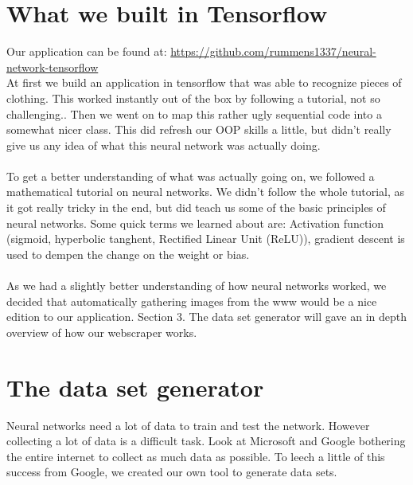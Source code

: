 \documentclass[fleqn,10pt]{SelfArx} %
\begin{document}
\section{What we built in Tensorflow}
Our application can be found at: \url{https://github.com/rummens1337/neural-network-tensorflow}\\
At first we build an application in tensorflow that was able to recognize pieces of clothing. This worked instantly out of the box by following a tutorial, not so challenging.. Then we went on to map this rather ugly sequential code into a somewhat nicer class. This did refresh our OOP skills a little, but didn't really give us any idea of what this neural network was actually doing. \\ \\
To get a better understanding of what was actually going on, we followed a mathematical tutorial on neural networks. We didn't follow the whole tutorial, as it got really tricky in the end, but did teach us some of the basic principles of neural networks. Some quick terms we learned about are: Activation function (sigmoid, hyperbolic tanghent, Rectified Linear Unit (ReLU)), gradient descent is used to dempen the change on the weight or bias. \\ \\
As we had a slightly better understanding of how neural networks worked, we decided that automatically gathering images from the www would be a nice edition to our application. Section 3. The data set generator will gave an in depth overview of how our webscraper \cite{WebScraping} works.

\section{The data set generator}
Neural networks need a lot of data to train and test the network. However collecting a lot of data is a difficult task. Look at Microsoft and Google bothering the entire internet to collect as much data as possible. To leech a little of this success from Google, we created our own tool to generate data sets.
\end{document}
